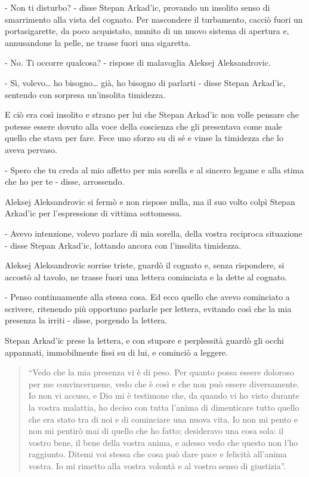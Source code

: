 - Non ti disturbo? - disse Stepan Arkad'ic, provando un insolito senso di smarrimento alla vista del cognato. Per nascondere il turbamento, cacciò fuori un portasigarette, da poco acquistato, munito di un nuovo sistema di apertura e, annusandone la pelle, ne trasse fuori una sigaretta. 

- No. Ti occorre qualcosa? - rispose di malavoglia Aleksej Aleksandrovic. 

- Sì, volevo\ldots{} ho bisogno\ldots{} già, ho bisogno di parlarti - disse Stepan Arkad'ic, sentendo con sorpresa un'insolita timidezza. 

E ciò era così insolito e strano per lui che Stepan Arkad'ic non volle pensare che potesse essere dovuto alla voce della coscienza che gli presentava come male quello che stava per fare. Fece uno sforzo su di sé e vinse la timidezza che lo aveva pervaso. 

- Spero che tu creda al mio affetto per mia sorella e al sincero legame e alla stima che ho per te - disse, arrossendo. 

Aleksej Aleksandrovic si fermò e non rispose nulla, ma il suo volto colpì Stepan Arkad'ic per l'espressione di vittima sottomessa. 

- Avevo intenzione, volevo parlare di mia sorella, della vostra reciproca situazione - disse Stepan Arkad'ic, lottando ancora con l'insolita timidezza. 

Aleksej Aleksandrovic sorrise triste, guardò il cognato e, senza rispondere, si accostò al tavolo, ne trasse fuori una lettera cominciata e la dette al cognato. 

- Penso continuamente alla stessa cosa. Ed ecco quello che avevo cominciato a scrivere, ritenendo più opportuno parlarle per lettera, evitando così che la mia presenza la irriti - disse, porgendo la lettera. 

Stepan Arkad'ic prese la lettera, e con stupore e perplessità guardò gli occhi appannati, immobilmente fissi su di lui, e cominciò a leggere. 

\begin{quote}
``Vedo che la mia presenza vi è di peso. Per quanto possa essere doloroso per me convincermene, vedo che è così e che non può essere diversamente. Io non vi accuso, e Dio mi è testimone che, da quando vi ho visto durante la vostra malattia, ho deciso con tutta l'anima di dimenticare tutto quello che era stato tra di noi e di cominciare una nuova vita. Io non mi pento e non mi pentirò mai di quello che ho fatto; desideravo una cosa sola: il vostro bene, il bene della vostra anima, e adesso vedo che questo non l'ho raggiunto. Ditemi voi stessa che cosa può dare pace e felicità all'anima vostra. Io mi rimetto alla vostra volontà e al vostro senso di giustizia''.
\end{quote} 

